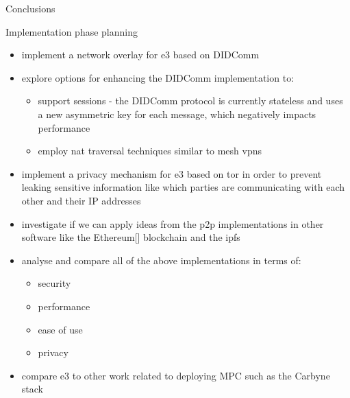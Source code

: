 \begin{frame}[fragile]{Conclusions}
\begin{block}{Implementation phase planning}
\begin{itemize}
  \begin{itemize}
  \tightlist
  \item
    using a \gls{ca} that is managed jointly using MPC
  \item
    using a form of \gls{ssi} such as \glspl{did}
  \end{itemize}
\item
  implement a network overlay for \gls{e3} based on DIDComm
\item
  explore options for enhancing the DIDComm implementation to:

  \begin{itemize}
  \tightlist
  \item
    support sessions - the DIDComm protocol is currently stateless and
    uses a new asymmetric key for each message, which negatively impacts
    performance
  \item
    employ \gls{nat} traversal techniques similar to mesh \glspl{vpn}
  \end{itemize}
\item
  implement a privacy mechanism for \gls{e3} based on \gls{tor} in order
  to prevent leaking sensitive information like which parties are
  communicating with each other and their IP addresses
\item
  investigate if we can apply ideas from the \gls{p2p} implementations
  in other software like the
  Ethereum{[}\textcite{ethereumDocs}{]}\autocite{ethereumYellowPaper}
  blockchain and the \gls{ipfs} \autocite{ipfsDocs}
\item
  analyse and compare all of the above implementations in terms of:

  \begin{itemize}
  \tightlist
  \item
    security
  \item
    performance
  \item
    ease of use
  \item
    privacy
  \end{itemize}
\item
  compare \gls{e3} to other work related to deploying MPC such as the
  Carbyne stack\autocite{robertboschgmbhCarbyneStack2022}
\end{itemize}
\end{block}
\end{frame}
